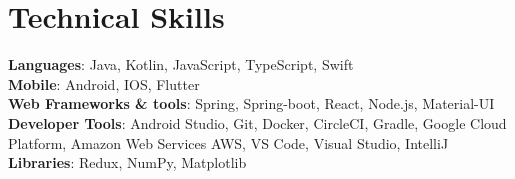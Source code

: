 \documentclass[letterpaper,11pt]{article}
\begin{document}
\section{Technical Skills}
 \begin{itemize}[leftmargin=0.15in, label={}]
    \small{\item{
     \textbf{Languages}{: Java, Kotlin, JavaScript, TypeScript, Swift} \\
     \textbf{Mobile}{: Android, IOS, Flutter} \\
     \textbf{Web Frameworks \& tools}{: Spring, Spring-boot, React, Node.js, Material-UI} \\
     \textbf{Developer Tools}{: Android Studio, Git, Docker, CircleCI, Gradle, Google Cloud Platform, Amazon Web Services AWS, VS Code, Visual Studio, IntelliJ} \\
     \textbf{Libraries}{: Redux, NumPy, Matplotlib}
    }}
 \end{itemize}


\end{document}
